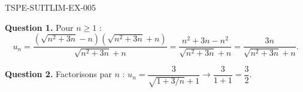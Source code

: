 \begin{corrige}{TSPE-SUITLIM-EX-005}


\textbf{Question 1.} Pour $n \geq 1$ :
\[
u_n = \frac{(\sqrt{n^2+3n} - n)(\sqrt{n^2+3n} + n)}{\sqrt{n^2+3n} + n} = \frac{n^2+3n - n^2}{\sqrt{n^2+3n}+n} = \frac{3n}{\sqrt{n^2+3n}+n}.
\]

\textbf{Question 2.} Factorisons par $n$ : $u_n = \dfrac{3}{\sqrt{1+3/n}+1} \to \dfrac{3}{1+1} = \boxed{\dfrac{3}{2}}$.

\end{corrige}
